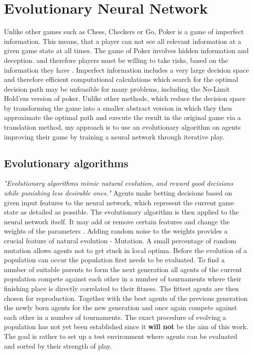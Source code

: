 \chapter{Evolutionary Neural Network}
Unlike other games such as Chess, Checkers or Go, Poker is a game of imperfect information. This means, that a player can not see all relevant  information at a given game state at all times. The game of Poker involves hidden information and deception. and therefore players must be willing to take risks, based on the information they have \cite{nn_evolve}. Imperfect information includes a very large decision space and therefore efficient computational calculations which search for the optimal decision path may be unfeasible for many problems, including the No-Limit Hold'em version of poker. Unlike other methods, which reduce the decision space by transforming the game into a smaller abstract version in which they then approximate the optimal path and  execute the result in the original game via a translation method, my approach is to use an evolutionary algorithm on agents improving their game by training a neural network through iterative play. \cite{nn_evolve}
\section{Evolutionary algorithms}
\textit{"Evolutionary algorithms mimic natural evolution, and reward good decisions while punishing less desirable ones.\cite{nn_evolve}"}
Agents make betting decisions based on given input features to the neural network, which represent the current game state as detailed as possible. The evolutionary algorithm is then applied to the neural network itself. It may add or remove certain features and change the weights of the parameters \cite{nn_evolve}. Adding random noise to the weights provides a crucial feature of natural evolution - Mutation. A small percentage of random mutation allows agents not to get stuck in local optima. Before the evolution of a population can occur the population first needs to be evaluated. To find a number of suitable parents to form the next generation all agents of the current population compete against each other in a number of tournaments where their finishing place is directly correlated to their fitness. The fittest agents are then chosen for reproduction. Together with the best agents of the previous generation the newly born agents for the new generation and once again compete against each other in a number of tournaments. The exact procedure of evolving a population has not yet been established since it \textbf{will not} be the aim of this work. The goal is rather to set up a test environment where agents can be evaluated and sorted by their strength of play.

